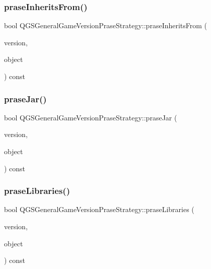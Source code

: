 \subsubsection{\texorpdfstring{prase\+Inherits\+From()}{praseInheritsFrom()}}
{\footnotesize\ttfamily bool Q\+G\+S\+General\+Game\+Version\+Prase\+Strategy\+::prase\+Inherits\+From (\begin{DoxyParamCaption}\item[{\mbox{\hyperlink{class_q_g_s_game_version}{Q\+G\+S\+Game\+Version}} \&}]{version,  }\item[{const Q\+Json\+Object \&}]{object }\end{DoxyParamCaption}) const\hspace{0.3cm}{\ttfamily [protected]}}

\mbox{\label{class_q_g_s_general_game_version_prase_strategy_aafcaa3387165b72061938f8ac3c8faf7}} 
\subsubsection{\texorpdfstring{prase\+Jar()}{praseJar()}}
{\footnotesize\ttfamily bool Q\+G\+S\+General\+Game\+Version\+Prase\+Strategy\+::prase\+Jar (\begin{DoxyParamCaption}\item[{\mbox{\hyperlink{class_q_g_s_game_version}{Q\+G\+S\+Game\+Version}} \&}]{version,  }\item[{const Q\+Json\+Object \&}]{object }\end{DoxyParamCaption}) const\hspace{0.3cm}{\ttfamily [protected]}}

\mbox{\label{class_q_g_s_general_game_version_prase_strategy_aa4d349c5c881f4f15272856fee9b1037}} 
\subsubsection{\texorpdfstring{prase\+Libraries()}{praseLibraries()}}
{\footnotesize\ttfamily bool Q\+G\+S\+General\+Game\+Version\+Prase\+Strategy\+::prase\+Libraries (\begin{DoxyParamCaption}\item[{\mbox{\hyperlink{class_q_g_s_game_version}{Q\+G\+S\+Game\+Version}} \&}]{version,  }\item[{const Q\+Json\+Object \&}]{object }\end{DoxyParamCaption}) const\hspace{0.3cm}{\ttfamily [protected]}}

